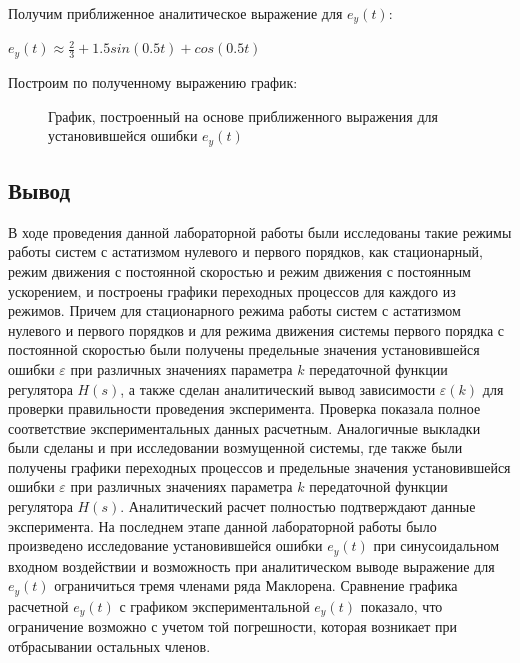\documentclass[a4paper, 11pt]{article}
\begin{document}
\newpage
Получим приближенное аналитическое выражение для $e_y(t)$:
\par 
$\displaystyle e_y(t)\approx\frac{2}{3}+1.5sin(0.5t)+cos(0.5t)$
\par 
Построим по полученному выражению график:

\begin{figure}[h]
\caption{График, построенный на основе приближенного выражения для установившейся ошибки $e_y(t)$}
\label{ris:image}
\end{figure}

\newpage
\begin{center}
\section*{Вывод}
\end{center}
\par 
В ходе проведения данной лабораторной работы были исследованы такие режимы работы систем с астатизмом нулевого и первого порядков, как стационарный, режим движения с постоянной скоростью и режим движения с постоянным ускорением, и построены графики переходных процессов для каждого из режимов. Причем для стационарного режима работы систем с астатизмом нулевого и первого порядков и для режима движения системы первого порядка с постоянной скоростью были получены предельные значения установившейся ошибки $\varepsilon$ при различных значениях параметра $k$ передаточной функции регулятора $H(s)$, а также сделан аналитический вывод зависимости $\varepsilon(k)$ для проверки правильности проведения эксперимента. Проверка показала полное соответствие экспериментальных данных расчетным. Аналогичные выкладки были сделаны и при исследовании возмущенной системы, где также были получены графики переходных процессов и предельные значения установившейся ошибки $\varepsilon$ при различных значениях параметра $k$ передаточной функции регулятора $H(s)$. Аналитический расчет полностью подтверждают данные эксперимента. На последнем этапе данной лабораторной работы было произведено исследование установившейся ошибки $e_y(t)$ при синусоидальном входном воздействии и возможность при аналитическом выводе выражение для $e_y(t)$ ограничиться тремя членами ряда Маклорена. Сравнение графика расчетной $e_y(t)$ с графиком экспериментальной $e_y(t)$ показало, что ограничение возможно с учетом той погрешности, которая возникает при отбрасывании остальных членов. 
\end{document}
